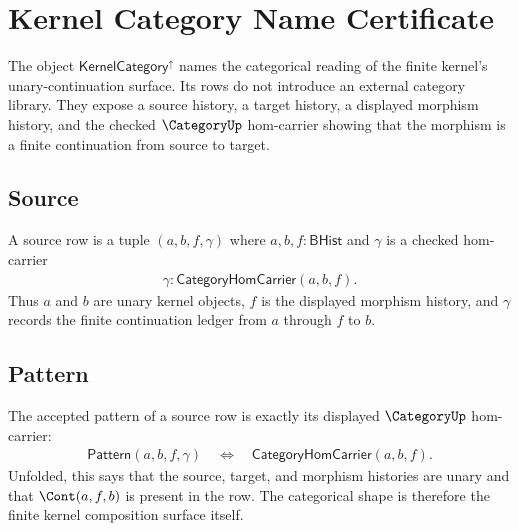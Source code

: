 \providecommand{\KernelCategoryUp}{\mathsf{KernelCategory}^{\uparrow}}

\chapter{Kernel Category Name Certificate}
\label{ch:concrete-instances-kernel-as-category}

The object $\KernelCategoryUp$ names the categorical reading of the finite
kernel's unary-continuation surface.  Its rows do not introduce an external
category library.  They expose a source history, a target history, a displayed
morphism history, and the checked $\CategoryUp$ hom-carrier showing that the
morphism is a finite continuation from source to target.

\section{Source}
\label{sec:concrete-instances-kernel-as-category-source}

\begin{definition}[Source rows for $\KernelCategoryUp$]
\label{def:concrete-instances-kernel-as-category-source}
A source row is a tuple $(a,b,f,\gamma)$ where $a,b,f:\mathsf{BHist}$ and
$\gamma$ is a checked hom-carrier
$$
\begin{aligned}
  \gamma:\mathsf{CategoryHomCarrier}(a,b,f).
\end{aligned}
$$
Thus $a$ and $b$ are unary kernel objects, $f$ is the displayed morphism
history, and $\gamma$ records the finite continuation ledger from $a$ through
$f$ to $b$.
\end{definition}

\section{Pattern}
\label{sec:concrete-instances-kernel-as-category-pattern}

\begin{definition}
\label{def:concrete-instances-kernel-as-category-pattern}
The accepted pattern of a source row is exactly its displayed
$\CategoryUp$ hom-carrier:
$$
\begin{aligned}
  \mathsf{Pattern}(a,b,f,\gamma)
  \quad\Longleftrightarrow\quad
  \mathsf{CategoryHomCarrier}(a,b,f).
\end{aligned}
$$
Unfolded, this says that the source, target, and morphism histories are unary
and that $\Cont(a,f,b)$ is present in the row.  The categorical shape is
therefore the finite kernel composition surface itself.
\end{definition}

